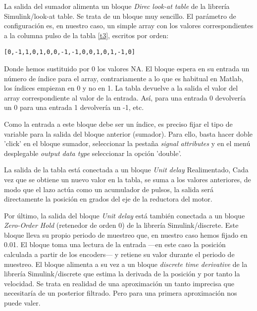 \documentclass[10pt,a4paper]{report}
\begin{document}
La salida del sumador alimenta un bloque \emph{Direc look-at table} de la librería Simulink/look-at table. Se trata de un bloque muy sencillo. El parámetro de configuración es, en nuestro caso, un simple array con los valores correspondientes a la columna pulso de la tabla \ref{t3}, escritos por orden:
\begin{verbatim}
[0,-1,1,0,1,0,0,-1,-1,0,0,1,0,1,-1,0]
\end{verbatim}
Donde hemos sustituido por 0 los valores NA. El bloque espera  en su entrada un número de índice para el array, contrariamente a lo que es habitual en Matlab, los índices empiezan en 0 y  no en 1. La tabla devuelve a la salida el valor del array correspondiente al valor de la entrada. Así, para una entrada 0 devolvería un 0 para una entrada 1 devolvería un -1, etc.

Como la entrada a este bloque debe ser un índice, es preciso fijar el tipo de variable para la salida del bloque anterior (sumador). Para ello, basta hacer doble 'click' en el bloque sumador, seleccionar la pestaña \emph{signal attributes} y en el menú desplegable \emph{output data type} seleccionar la opción 'double'. 

La salida de la tabla está conectada a un bloque \emph{Unit delay} Realimentado, Cada vez que se obtiene un nuevo valor en la tabla, se suma a los valores anteriores, de modo que el lazo actúa como un acumulador de pulsos, la salida será directamente la posición en grados del eje de la reductora del motor.

Por último, la salida del bloque \emph{Unit delay} está también conectada a un bloque \emph{Zero-Order Hold} (retenedor de orden 0) de la librería Simulink/discrete. Este bloque lleva su propio periodo de muestreo que, en nuestro caso hemos fijado en 0.01. El bloque toma una lectura de la entrada ---en este caso la posición calculada a partir de los encoders--- y retiene su valor durante el periodo de muestreo. El bloque alimenta a su vez a un bloque \emph{discrete time derivative} de la librería Simulink/discrete que estima la derivada de la posición y por tanto la velocidad. Se trata en realidad de una aproximación un tanto imprecisa que necesitaría de un posterior filtrado. Pero para una primera aproximación nos puede valer.
\end{document}
